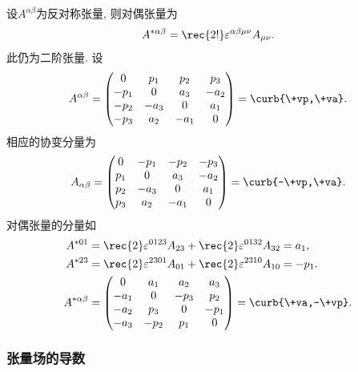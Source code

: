\documentclass[hidelinks]{ctexart}
\begin{document}
\begin{sample}
    \begin{ex}
        设$A^{\alpha\beta}$为反对称张量, 则对偶张量为
        \[ A^{*\alpha\beta} = \rec{2!}\varepsilon^{\alpha\beta\mu\nu}A_{\mu\nu}. \]
        此仍为二阶张量. 设
        \[ A^{\alpha\beta} = \begin{pmatrix}
            0 & p_1 & p_2 & p_3 \\
            -p_1 & 0 & a_3 & -a_2 \\
            -p_2 & -a_3 & 0 & a_1 \\
            -p_3 & a_2 & -a_1 & 0
        \end{pmatrix} = \curb{\+vp,\+va}. \]
        相应的协变分量为
        \[ A_{\alpha\beta} = \begin{pmatrix}
            0 & -p_1 & -p_2 & -p_3 \\
            p_1 & 0 & a_3 & -a_2 \\
            p_2 & -a_3 & 0 & a_1 \\
            p_3 & a_2 & -a_1 & 0
        \end{pmatrix} = \curb{-\+vp,\+va}. \]
        对偶张量的分量如
        \begin{align*}
            A^{*01} &= \rec{2}\varepsilon^{0123}A_{23} + \rec{2}\varepsilon^{0132}A_{32} = a_1, \\
            A^{*23} &= \rec{2}\varepsilon^{2301}A_{01} + \rec{2}\varepsilon^{2310}A_{10} = -p_1. \\
            A^{*\alpha\beta} &= \begin{pmatrix}
                0 & a_1 & a_2 & a_3 \\
                -a_1 & 0 & -p_3 & p_2 \\
                -a_2 & p_3 & 0 & -p_1 \\
                -a_3 & -p_2 & p_1 & 0
            \end{pmatrix} = \curb{\+va,-\+vp}.
        \end{align*}
    \end{ex}
\end{sample}


\subsubsection{张量场的导数} %
\label{ssub:张量场的导数}
\end{document}
